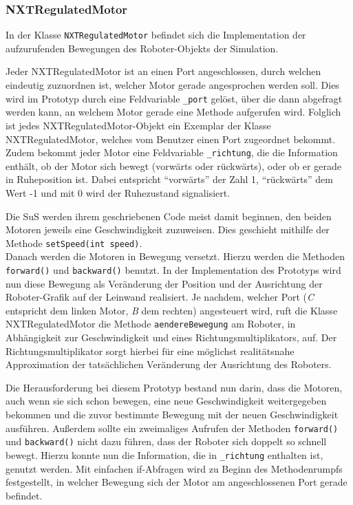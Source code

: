 \documentclass[paper=a4, pagesize, DIV=calc, BCOR=15mm, twoside=on, onecolumn=on, open = right, titlepage =on, parskip =half-, headsepline = on, footsepline = on, chapterprefix = on, appendixprefix = off, fontsize = 12pt, numbers = noenddot, abstract = on]{scrbook}
\numberwithin{equation}{chapter}
\theoremstyle{definition}
\theoremstyle{plain}
\theoremstyle{plain}
\theoremstyle{remark}
\theoremstyle{plain}
\theoremstyle{plain}
\begin{document}
\subsubsection{NXTRegulatedMotor}
In der Klasse \texttt{NXTRegulatedMotor} befindet sich die Implementation der aufzurufenden Bewegungen des Roboter-Objekts der Simulation.

Jeder NXTRegulatedMotor ist an einen Port angeschlossen, durch welchen eindeutig zuzuordnen ist, welcher Motor gerade angesprochen werden soll. Dies wird im Prototyp durch eine Feldvariable \texttt{{\_}port} gelöst, über die dann abgefragt werden kann, an welchem Motor gerade eine Methode aufgerufen wird. Folglich ist jedes NXTRegulatedMotor-Objekt ein Exemplar der Klasse NXTRegulatedMotor, welches vom Benutzer einen Port zugeordnet bekommt.\\
Zudem bekommt jeder Motor eine Feldvariable \texttt{{\_}richtung}, die die Information enthält, ob der Motor sich bewegt (vorwärts oder rückwärts), oder ob er gerade in Ruheposition ist. Dabei entspricht "`vorwärts"' der Zahl 1, "`rückwärts"' dem Wert -1 und mit 0 wird der Ruhezustand signalisiert.

Die SuS werden ihrem geschriebenen Code meist damit beginnen, den beiden Motoren jeweils eine Geschwindigkeit zuzuweisen. Dies geschieht mithilfe der Methode \texttt{setSpeed(int speed)}.\\
Danach werden die Motoren in Bewegung versetzt. Hierzu werden die Methoden\\
\texttt{forward()} und \texttt{backward()} benutzt. In der Implementation des Prototyps wird nun diese Bewegung als Veränderung der Position und der Ausrichtung der Roboter-Grafik auf der Leinwand realisiert. Je nachdem, welcher Port (\emph{C} entspricht dem linken Motor, \emph{B} dem rechten) angesteuert wird, ruft die Klasse NXTRegulatedMotor die Methode \texttt{aendereBewegung} am Roboter, in Abhängigkeit zur Geschwindigkeit und eines Richtungsmultiplikators, auf. Der Richtungsmultiplikator sorgt hierbei für eine möglichst realitätsnahe Approximation der tatsächlichen Veränderung der Ausrichtung des Roboters.

Die Herausforderung bei diesem Prototyp bestand nun darin, dass die Motoren, auch wenn sie sich schon bewegen, eine neue Geschwindigkeit weitergegeben bekommen und die zuvor bestimmte Bewegung mit der neuen Geschwindigkeit ausführen. Außerdem sollte ein zweimaliges Aufrufen der Methoden \texttt{forward()} und \texttt{backward()} nicht dazu führen, dass der Roboter sich doppelt so schnell bewegt. Hierzu konnte nun die Information, die in  \texttt{{\_}richtung} enthalten ist, genutzt werden. Mit einfachen if-Abfragen wird zu Beginn des Methodenrumpfs festgestellt, in welcher Bewegung sich der Motor am angeschlossenen Port gerade befindet. 
\end{document}
